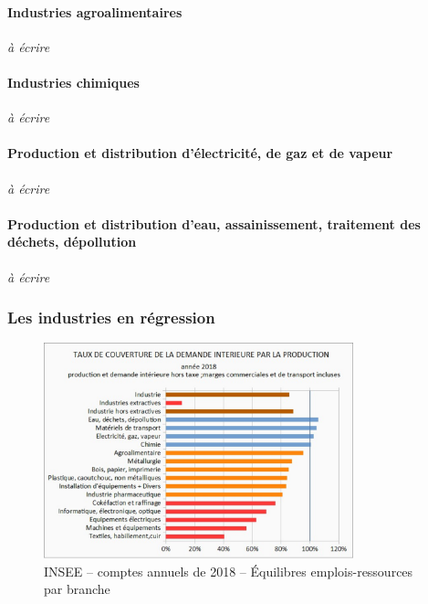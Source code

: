 \documentclass[a4paper]{article}
\begin{document}
\paragraph{Industries agroalimentaires}
\textit{à écrire}

\paragraph{Industries chimiques}
\textit{à écrire}

\paragraph{Production et distribution d’électricité, de gaz et de vapeur}
\textit{à écrire}

\paragraph{Production et distribution d’eau, assainissement, traitement des déchets, dépollution}
\textit{à écrire}

\subsubsection{Les industries en régression}

\begin{figure}[H]
    \centering
    \includegraphics*[width=0.8\textwidth]{images/couverture}
    \caption{INSEE – comptes annuels de 2018 – Équilibres emplois-ressources par branche}
    \label{fig:couverture}
\end{figure}
\end{document}

